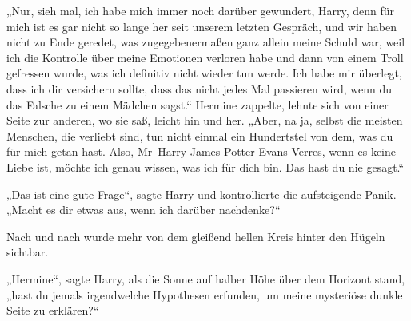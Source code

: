 „Nur, sieh mal, ich habe mich immer noch darüber gewundert, Harry, denn für mich ist es gar nicht so lange her seit unserem letzten Gespräch, und wir haben nicht zu Ende geredet, was zugegebenermaßen ganz allein meine Schuld war, weil ich die Kontrolle über meine Emotionen verloren habe und dann von einem Troll gefressen wurde, was ich definitiv nicht wieder tun werde. Ich habe mir überlegt, dass ich dir versichern sollte, dass das nicht jedes Mal passieren wird, wenn du das Falsche zu einem Mädchen sagst.“ Hermine zappelte, lehnte sich von einer Seite zur anderen, wo sie saß, leicht hin und her. „Aber, na ja, selbst die meisten Menschen, die verliebt sind, tun nicht einmal ein Hundertstel von dem, was du für mich getan hast. Also, Mr~Harry James Potter-Evans-Verres, wenn es keine Liebe ist, möchte ich genau wissen, was ich für dich bin. Das hast du nie gesagt.“

„Das ist eine gute Frage“, sagte Harry und kontrollierte die aufsteigende Panik. „Macht es dir etwas aus, wenn ich darüber nachdenke?“

Nach und nach wurde mehr von dem gleißend hellen Kreis hinter den Hügeln sichtbar.

„Hermine“, sagte Harry, als die Sonne auf halber Höhe über dem Horizont stand,
„hast du jemals irgendwelche Hypothesen erfunden, um meine mysteriöse dunkle Seite zu erklären?“

